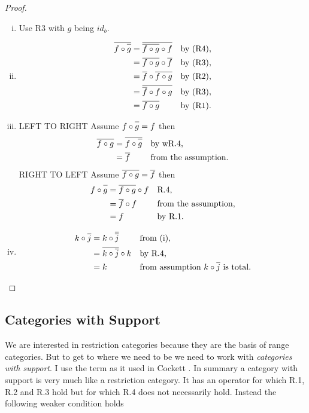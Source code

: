\begin{proof}
\begin{enumerate} [(i)]
\item Use R3 with $g$ being $id_b$.
\item 
\begin{align*}
\rst{f \circ \rst{g}}
&= \rst{\rst{f \circ g} \circ f}
    && \text{by (R4),} \\
&= \rst{f \circ g} \circ \rst{f}
    && \text{by (R3),} \\
&= \rst{f} \circ \rst{f \circ g}
    && \text{by (R2),} \\
  &= \rst{\rst{f} \circ f \circ g}
    && \text{by (R3),} \\  
&= \rst{f \circ g}
    && \text{by (R1).}
\end{align*}
\item 
LEFT TO RIGHT
Assume $f \circ \rst{g} = f$
then
\begin{align*}
\rst{f \circ g} &= \rst{f \circ \rst{g}} && \mbox{by wR.4,}\\
                     &= \rst{f} && \mbox{from the assumption.}
\end{align*}
RIGHT TO LEFT
Assume $\rst{f \circ g} = \rst{f}$
then
\begin{align*}
f \circ \rst{g} &= \rst{f \circ g} \circ f 
                                  && \mbox{R.4,} \\
                &= \rst{f} \circ f 
                                  && \mbox{from the assumption,} \\
                &= f              && \mbox{by R.1.}
\end{align*}
\item 
\begin{align*}
k \circ \rst{j} &= k \circ \rst{\rst{j}}              && \mbox{from (i),}\\
                &= \rst{k \circ \rst{j}} \circ k && \mbox{by R.4,}   \\
                &= k                                  && \mbox{from assumption $k \circ \rst{j}$ is total.}
\end{align*}
\end{enumerate}
\end{proof}

\subsection{Categories with Support}
We are  interested in restriction categories because they are the basis of  range categories. 
But to get to  where we need to be we need to work with 
\textit{categories with support}. I use the term as it used
in Cockett \cite{COCKETT2012}. In summary a category with support is very much like a restriction category. It has an operator  \rstItself for which R.1, R.2 and R.3 hold but for which R.4 does not necessarily hold. Instead the following
weaker condition holds


